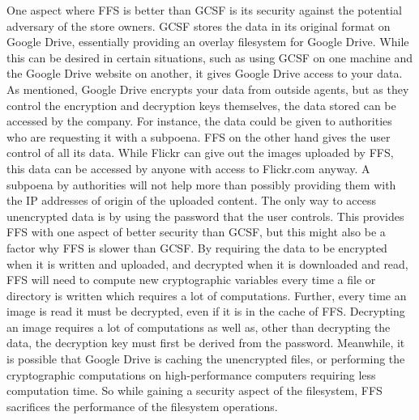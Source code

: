 One aspect where \gls{FFS} is better than \gls{GCSF} is its security against the potential adversary of the store owners. \gls{GCSF} stores the data in its original format on Google Drive, essentially providing an overlay filesystem for Google Drive. While this can be desired in certain situations, such as using \gls{GCSF} on one machine and the Google Drive website on another, it gives Google Drive access to your data. As mentioned, Google Drive encrypts your data from outside agents, but as they control the encryption and decryption keys themselves, the data stored can be accessed by the company. For instance, the data could be given to authorities who are requesting it with a subpoena. 
\gls{FFS} on the other hand gives the user control of all its data. While Flickr can give out the images uploaded by \gls{FFS}, this data can be accessed by anyone with access to Flickr.com anyway. A subpoena by authorities will not help more than possibly providing them with the IP addresses of origin of the uploaded content. The only way to access unencrypted data is by using the password that the user controls. This provides \gls{FFS} with one aspect of better security than \gls{GCSF}, but this might also be a factor why \gls{FFS} is slower than \gls{GCSF}. By requiring the data to be encrypted when it is written and uploaded, and decrypted when it is downloaded and read, \gls{FFS} will need to compute new cryptographic variables every time a file or directory is written which requires a lot of computations. Further, every time an image is read it must be decrypted, even if it is in the cache of \gls{FFS}. Decrypting an image requires a lot of computations as well as, other than decrypting the data, the decryption key must first be derived from the password. Meanwhile, it is possible that Google Drive is caching the unencrypted files, or performing the cryptographic computations on \mbox{high-performance} computers requiring less computation time. So while gaining a security aspect of the filesystem, \gls{FFS} sacrifices the performance of the filesystem operations.

